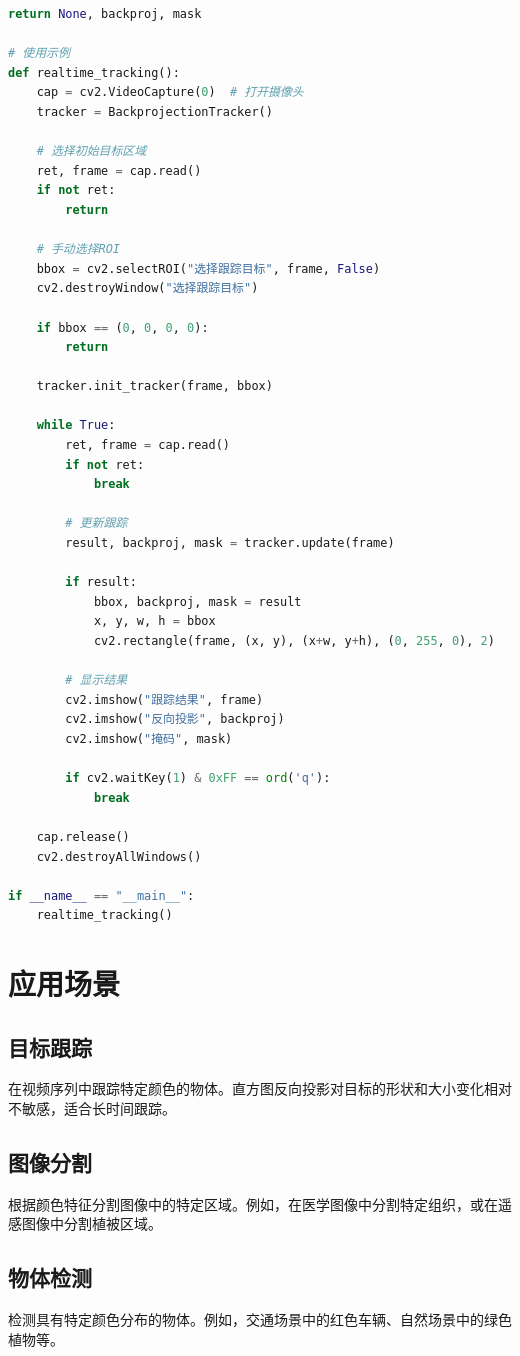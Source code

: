 \documentclass{article}
\begin{document}
\begin{lstlisting}[language=Python, caption={基于直方图反向投影的实时目标跟踪}]
        return None, backproj, mask

# 使用示例
def realtime_tracking():
    cap = cv2.VideoCapture(0)  # 打开摄像头
    tracker = BackprojectionTracker()

    # 选择初始目标区域
    ret, frame = cap.read()
    if not ret:
        return

    # 手动选择ROI
    bbox = cv2.selectROI("选择跟踪目标", frame, False)
    cv2.destroyWindow("选择跟踪目标")

    if bbox == (0, 0, 0, 0):
        return

    tracker.init_tracker(frame, bbox)

    while True:
        ret, frame = cap.read()
        if not ret:
            break

        # 更新跟踪
        result, backproj, mask = tracker.update(frame)

        if result:
            bbox, backproj, mask = result
            x, y, w, h = bbox
            cv2.rectangle(frame, (x, y), (x+w, y+h), (0, 255, 0), 2)

        # 显示结果
        cv2.imshow("跟踪结果", frame)
        cv2.imshow("反向投影", backproj)
        cv2.imshow("掩码", mask)

        if cv2.waitKey(1) & 0xFF == ord('q'):
            break

    cap.release()
    cv2.destroyAllWindows()

if __name__ == "__main__":
    realtime_tracking()
\end{lstlisting}

\section{应用场景}

\subsection{目标跟踪}
在视频序列中跟踪特定颜色的物体。直方图反向投影对目标的形状和大小变化相对不敏感，适合长时间跟踪。

\subsection{图像分割}
根据颜色特征分割图像中的特定区域。例如，在医学图像中分割特定组织，或在遥感图像中分割植被区域。

\subsection{物体检测}
检测具有特定颜色分布的物体。例如，交通场景中的红色车辆、自然场景中的绿色植物等。
\end{document}
